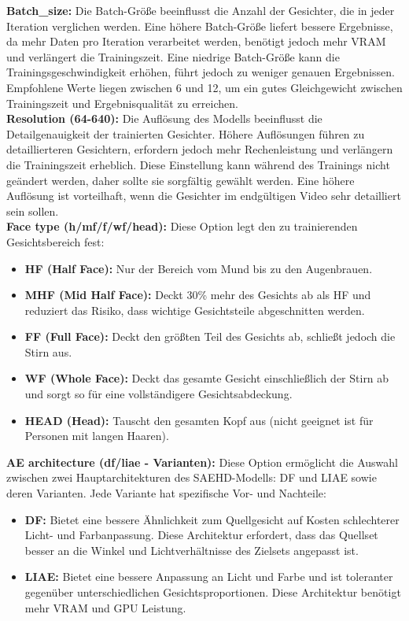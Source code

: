 \textbf{Batch\_size:} Die Batch-Größe beeinflusst die Anzahl der Gesichter, die in jeder Iteration verglichen werden.
Eine höhere Batch-Größe liefert bessere Ergebnisse, da mehr Daten pro Iteration verarbeitet werden, benötigt jedoch mehr VRAM und verlängert die Trainingszeit.
Eine niedrige Batch-Größe kann die Trainingsgeschwindigkeit erhöhen, führt jedoch zu weniger genauen Ergebnissen.
Empfohlene Werte liegen zwischen 6 und 12, um ein gutes Gleichgewicht zwischen Trainingszeit und Ergebnisqualität zu erreichen.\\

\textbf{Resolution (64-640):} Die Auflösung des Modells beeinflusst die Detailgenauigkeit der trainierten Gesichter.
Höhere Auflösungen führen zu detaillierteren Gesichtern, erfordern jedoch mehr Rechenleistung und verlängern die Trainingszeit erheblich.
Diese Einstellung kann während des Trainings nicht geändert werden, daher sollte sie sorgfältig gewählt werden.
Eine höhere Auflösung ist vorteilhaft, wenn die Gesichter im endgültigen Video sehr detailliert sein sollen.\\

\textbf{Face type (h/mf/f/wf/head):} Diese Option legt den zu trainierenden Gesichtsbereich fest:
\begin{itemize}
    \item \textbf{HF (Half Face):} Nur der Bereich vom Mund bis zu den Augenbrauen.
    \item \textbf{MHF (Mid Half Face):} Deckt 30\% mehr des Gesichts ab als HF und reduziert das Risiko, dass wichtige Gesichtsteile abgeschnitten werden.
    \item \textbf{FF (Full Face):} Deckt den größten Teil des Gesichts ab, schließt jedoch die Stirn aus.
    \item \textbf{WF (Whole Face):} Deckt das gesamte Gesicht einschließlich der Stirn ab und sorgt so für eine vollständigere Gesichtsabdeckung.
    \item \textbf{HEAD (Head):} Tauscht den gesamten Kopf aus (nicht geeignet ist für Personen mit langen Haaren).
\end{itemize}

\textbf{AE architecture (df/liae - Varianten):} Diese Option ermöglicht die Auswahl zwischen zwei Hauptarchitekturen des SAEHD-Modells: DF und LIAE sowie deren Varianten.
Jede Variante hat spezifische Vor- und Nachteile:
\begin{itemize}
    \item \textbf{DF:} Bietet eine bessere Ähnlichkeit zum Quellgesicht auf Kosten schlechterer Licht- und Farbanpassung.
Diese Architektur erfordert, dass das Quellset besser an die Winkel und Lichtverhältnisse des Zielsets angepasst ist.
    \item \textbf{LIAE:} Bietet eine bessere Anpassung an Licht und Farbe und ist toleranter gegenüber unterschiedlichen Gesichtsproportionen.
Diese Architektur benötigt mehr VRAM und GPU Leistung.
\end{itemize}

